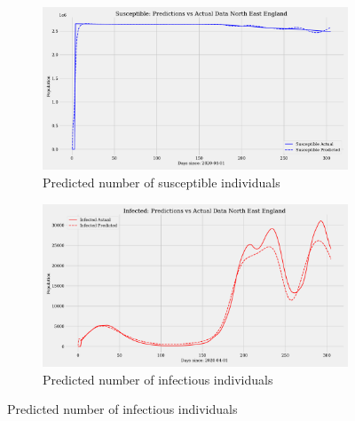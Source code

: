 \documentclass[12pt]{article}
\begin{document}
\begin{figure}
    \centering
    \begin{subfigure}[t]{0.45\textwidth}
        \includegraphics[width=\textwidth]{images/pinn/S_predictions_North East England.pdf}
        \caption{Predicted number of susceptible individuals}
        \label{fig:S_predictions_North East England}
    \end{subfigure}
    \hfill %
    \begin{subfigure}[t]{0.45\textwidth}
        \includegraphics[width=\textwidth]{images/pinn/I_predictions_North East England.pdf}
        \caption{Predicted number of infectious individuals}
        \label{fig:I_predictions_North East England}
    \end{subfigure}

    \vspace{0.5cm}


\end{figure}
\end{document}
